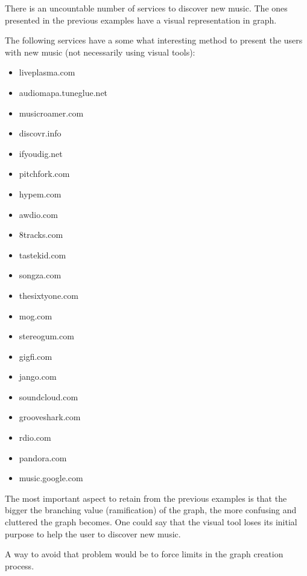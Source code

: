   There is an uncountable number of services to discover new music.
  The ones presented in the previous examples have a visual representation in graph.

  The following services have a some what interesting method to present the users with new music (not necessarily using visual tools):


  \begin{itemize}
    \item liveplasma.com
    \item audiomapa.tuneglue.net
    \item musicroamer.com
    \item discovr.info
    \item ifyoudig.net
    \item pitchfork.com
    \item hypem.com
    \item awdio.com
    \item 8tracks.com
    \item tastekid.com
    \item songza.com
    \item thesixtyone.com
    \item mog.com
    \item stereogum.com
    \item gigfi.com
    \item jango.com
    \item soundcloud.com
    \item grooveshark.com
    \item rdio.com
    \item pandora.com
    \item music.google.com
  \end{itemize}


  The most important aspect to retain from the previous examples is that the bigger the branching value (ramification) of the graph, the more confusing and cluttered the graph becomes.
  One could say that the visual tool loses its initial purpose to help the user to discover new music.

  A way to avoid that problem would be to force limits in the graph creation process.
